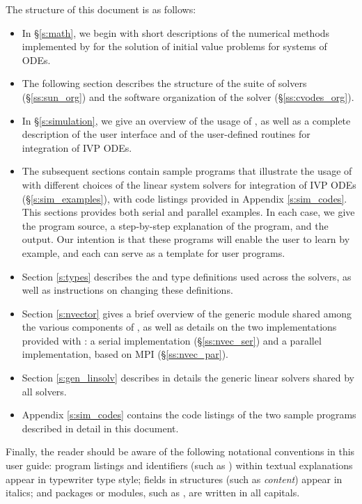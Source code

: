 The structure of this document is as follows:
\begin{itemize}
\item
  In \S\ref{s:math}, we begin with short descriptions of the numerical 
  methods implemented by {\cvode} for the solution of initial value problems
  for systems of ODEs.
\item
  The following section describes the structure of the {\sundials} suite
  of solvers (\S\ref{ss:sun_org}) and the software organization of the {\cvode}
  solver (\S\ref{ss:cvodes_org}). 
\item
  In \S\ref{s:simulation}, we give an overview of the usage of {\cvode},
  as well as a complete description of the user interface and of the 
  user-defined routines for integration of IVP ODEs.
\item
  The subsequent sections contain sample programs that illustrate
  the usage of {\cvode} with different choices of the linear system
  solvers for integration of IVP ODEs (\S\ref{s:sim_examples}),
  with code listings provided in Appendix \ref{s:sim_codes}.
  This sections provides both serial and parallel examples. 
  In each case, we give the program source, a step-by-step explanation 
  of the program, and the output. Our intention is that these programs 
  will enable the user to learn {\cvode} by example, and each can 
  serve as a template for user programs.
\item
  Section \ref{s:types} describes the  and  type definitions used 
  across the {\sundials} solvers, as well as instructions on changing these definitions.
\item
  Section \ref{s:nvector} gives a brief overview of the generic {\nvector} module 
  shared among the various components of {\sundials}, as well as details on the two {\nvector}
  implementations provided with {\sundials}: a serial implementation
  (\S\ref{ss:nvec_ser}) and a parallel implementation, based on MPI
  (\S\ref{ss:nvec_par}).
\item
  Section \ref{s:gen_linsolv} describes in details the generic linear solvers shared 
  by all {\sundials} solvers.
\item Appendix \ref{s:sim_codes} contains the 
  code listings of the two {\cvode} sample programs described in detail
  in this document.
\end{itemize}

Finally, the reader should be aware of the following notational conventions
in this user guide:  program listings and identifiers (such as ) 
within textual explanations appear in typewriter type style; 
fields in {\C} structures (such as {\em content}) appear in italics;
and packages or modules, such as {\cvdense}, are written in all capitals. 
